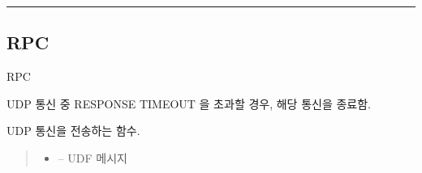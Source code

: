 \documentclass[a4paper,10pt,english]{sphinxmanual}
\begin{document}
\bigskip\hrule\bigskip



\subsection{RPC}
\label{\detokenize{_kademlia:rpc}}

\begin{fulllineitems}
\label{\detokenize{_kademlia:RPC}}
\pysigstartsignatures
{}
\pysigstopsignatures
\sphinxAtStartPar
RPC

\begin{fulllineitems}
\label{\detokenize{_kademlia:RPC._expireRPCs}}
\pysigstartsignatures
{}
\pysigstopsignatures
\sphinxAtStartPar
UDP 통신 중 RESPONSE TIMEOUT 을 초과할 경우, 해당 통신을 종료함.

\end{fulllineitems}


\begin{fulllineitems}
\label{\detokenize{_kademlia:RPC._onMessage}}
\pysigstartsignatures
{}
\pysigstopsignatures
\sphinxAtStartPar
UDP 통신을 전송하는 함수.
\begin{quote}\begin{description}
\begin{itemize}
\item {} 
\sphinxAtStartPar
{} – UDF 메시지

\end{itemize}

\end{description}\end{quote}

\end{fulllineitems}


\end{fulllineitems}
\end{document}
